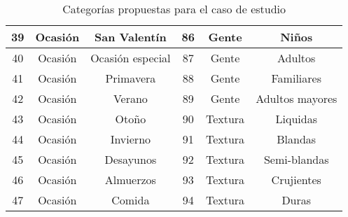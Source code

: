 \begin{table}
\begin{center}
\begin{tabular}{ | c | c | c | c | c | c |}
        39 & Ocasión & San Valentín  & 86 & Gente & Niños \\
        \midrule
        40 & Ocasión & Ocasión especial & 87 & Gente & Adultos \\
        \midrule
        41 & Ocasión & Primavera  & 88 & Gente & Familiares \\
        \midrule
        42 & Ocasión & Verano  & 89 & Gente & Adultos mayores \\
        \midrule
        43 & Ocasión & Otoño  & 90 & Textura & Liquidas \\
        \midrule
        44 & Ocasión & Invierno  & 91 & Textura & Blandas \\
        \midrule
        45 & Ocasión & Desayunos  & 92 & Textura & Semi-blandas \\
        \midrule
        46 & Ocasión & Almuerzos  & 93 & Textura & Crujientes \\
        \midrule
        47 & Ocasión   & Comida & 94 & Textura & Duras \\
        \bottomrule
      \end{tabular}
      \caption{Categorías propuestas para el caso de estudio}
      \label{table:caracteristicas}
    \end{center}
  \end{table}

